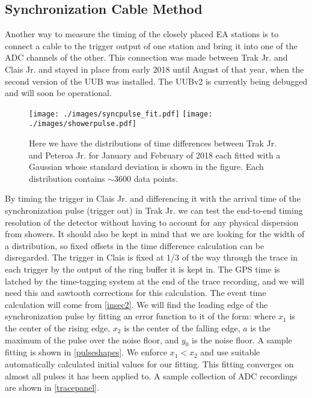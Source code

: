 \subsection{Synchronization Cable Method}%
Another way to measure the timing of the closely placed EA stations is to connect a cable to the trigger output of one station and bring it into one of the ADC channels of the other. This connection was made between Trak Jr. and Clais Jr. and stayed in place from early 2018 until August of that year, when the second version of the UUB was installed. The UUBv2 is currently being debugged and will soon be operational. 

\begin{figure}[H]
\centering
\texttt{[image: ./images/syncpulse\_fit.pdf]}
\texttt{[image: ./images/showerpulse.pdf]}
\caption[Distribution of Distances-to-Detector]{Here we have the distributions of time differences between Trak Jr. and Peteroa Jr. for January and February of 2018 each fitted with a Gaussian whose standard deviation is shown in the figure. Each distribution contains $\sim$3600 data points.}
\label{pulseshapes}
\end{figure}

By timing the trigger in Clais Jr. and differencing it with the arrival time of the synchronization pulse (trigger out) in Trak Jr. we can test the end-to-end timing resolution of the detector without having to account for any physical dispersion from showers. It should also be kept in mind that we are looking for the width of a distribution, so fixed offsets in the time difference calculation can be disregarded. The trigger in Clais is fixed at 1/3 of the way through the trace in each trigger by the output of the ring buffer it is kept in. The GPS time is latched by the time-tagging system at the end of the trace recording, and we will need this and sawtooth corrections for this calculation. The event time calculation will come from \autoref{insec2}. We will find the leading edge of the synchronization pulse by fitting an error function to it of the form:
where $x_1$ is the center of the rising edge, $x_2$ is the center of the falling edge, $a$ is the maximum of the pulse over the noise floor, and $y_0$ is the noise floor. A sample fitting is shown in \autoref{pulseshapes}. We enforce $x_1<x_2$ and use suitable automatically calculated initial values for our fitting. This fitting converges on almost all pulses it has been applied to. A sample collection of ADC recordings are shown in \autoref{tracepanel}.


